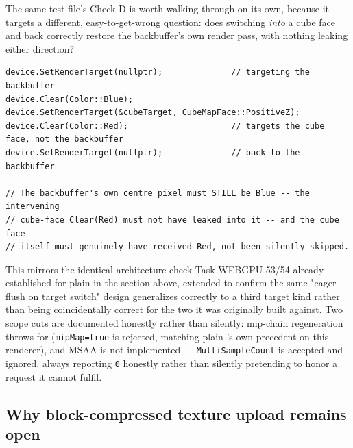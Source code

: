 The same test file's Check D is worth walking through on its own, because it targets a
different, easy-to-get-wrong question: does switching \emph{into} a cube face and back
correctly restore the backbuffer's own render pass, with nothing leaking either direction?

\begin{lstlisting}
device.SetRenderTarget(nullptr);              // targeting the backbuffer
device.Clear(Color::Blue);
device.SetRenderTarget(&cubeTarget, CubeMapFace::PositiveZ);
device.Clear(Color::Red);                     // targets the cube face, not the backbuffer
device.SetRenderTarget(nullptr);              // back to the backbuffer

// The backbuffer's own centre pixel must STILL be Blue -- the intervening
// cube-face Clear(Red) must not have leaked into it -- and the cube face
// itself must genuinely have received Red, not been silently skipped.
\end{lstlisting}

This mirrors the identical architecture check Task WEBGPU-53/54 already established for plain
 in the section above, extended to confirm the same "eager flush on
target switch" design generalizes correctly to a third target kind rather than being
coincidentally correct for the two it was originally built against. Two scope cuts are
documented honestly rather than silently: mip-chain regeneration throws for
 (\texttt{mipMap=true} is rejected, matching plain
's own precedent on this renderer), and MSAA is not implemented ---
\texttt{MultiSampleCount} is accepted and ignored, always reporting \texttt{0} honestly rather
than silently pretending to honor a request it cannot fulfil.

\subsection{Why block-compressed texture upload remains open}

